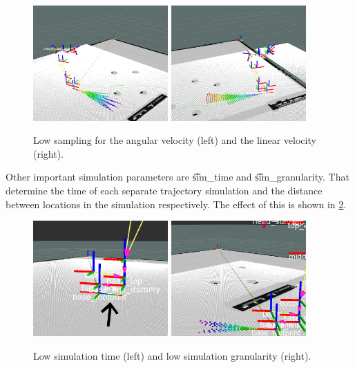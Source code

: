\begin{figure}
	\centering
	\includegraphics[width=0.46\textwidth]{./img/5samplingtheta}
	\includegraphics[width=0.46\textwidth]{./img/xsampling}
	\caption{Low sampling for the angular velocity (left) and the linear velocity (right).}
	\label{fig:5:sampling}
\end{figure}

Other important simulation parameters are \t{sim_time} and \t{sim_granularity}. That determine the time of each separate trajectory simulation and the distance between locations in the simulation respectively. The effect of this is shown in \cref{fig:5:sim}.

\begin{figure}
	\centering
	\includegraphics[width=0.46\textwidth]{./img/1simtime}
	\includegraphics[width=0.46\textwidth]{./img/09granularity}
	\caption{Low simulation time (left) and low simulation granularity (right).}
	\label{fig:5:sim}
\end{figure}

